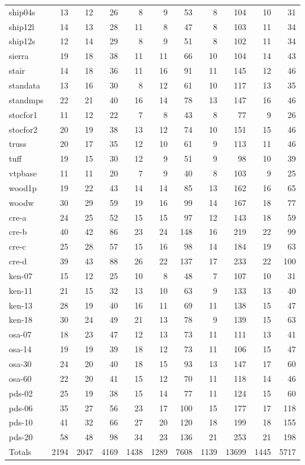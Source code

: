 \begin{small}
\begin{longtable}{|l|r|rr||r|rr||rr||rr|}
ship04s  & 13 & 12 & 26  & 8 & 9 & 53 & 8 & 104 & 10 & 31 \\
ship12l  & 14 & 13 & 28  & 11 & 8 & 47 & 8 & 103 & 11 & 34 \\
ship12s  & 12 & 14 & 29  & 8 & 9 & 51 & 8 & 102 & 11 & 34 \\
sierra   & 19 & 18 & 38  & 11 & 11 & 66 & 10 & 104 & 14 & 43 \\
stair    & 14 & 18 & 36  & 11 & 16 & 91 & 11 & 145 & 12 & 46 \\
standata & 13 & 16 & 30  & 8 & 12 & 61 & 10 & 117 & 13 & 35 \\
standmps & 22 & 21 & 40  & 16 & 14 & 78 & 13 & 147 & 16 & 46 \\
stocfor1 & 11 & 12 & 22  & 7 & 8 & 43 & 8 & 77 & 9 & 26 \\
stocfor2 & 20 & 19 & 38  & 13 & 12 & 74 & 10 & 151 & 15 & 46 \\
truss    & 20 & 17 & 35  & 12 & 10 & 61 & 9 & 113 & 11 & 46 \\
tuff     & 19 & 15 & 30  & 12 & 9 & 51 & 9 & 98 & 10 & 39 \\
vtpbase  & 11 & 11 & 20  & 7 & 9 & 40 & 8 & 103 & 9 & 25 \\
wood1p   & 19 & 22 & 43  & 14 & 14 & 85 & 13 & 162 & 16 & 65 \\
woodw    & 30 & 29 & 59  & 19 & 16 & 99 & 14 & 167 & 18 & 77 \\
cre-a    & 24 & 25 & 52  & 15 & 15 & 97 & 12 & 143 & 18 & 59 \\
cre-b    & 40 & 42 & 86  & 23 & 24 & 148 & 16 & 219 & 22 & 99 \\
cre-c    & 25 & 28 & 57  & 15 & 16 & 98 & 14 & 184 & 19 & 63 \\
cre-d    & 39 & 43 & 88  & 26 & 22 & 137 & 17 & 233 & 22 & 100 \\
ken-07   & 15 & 12 & 25  & 10 & 8 & 48 & 7 & 107 & 10 & 31 \\
ken-11   & 21 & 15 & 32  & 13 & 10 & 63 & 9 & 133 & 13 & 40 \\
ken-13   & 28 & 19 & 40  & 16 & 11 & 69 & 11 & 138 & 15 & 47 \\
ken-18   & 30 & 24 & 49  & 21 & 13 & 78 & 9 & 139 & 15 & 63 \\
osa-07   & 18 & 23 & 47  & 12 & 13 & 73 & 11 & 111 & 13 & 41 \\
osa-14   & 19 & 19 & 39  & 18 & 12 & 73 & 11 & 106 & 15 & 47 \\
osa-30   & 24 & 20 & 40  & 18 & 15 & 93 & 13 & 147 & 17 & 60 \\
osa-60   & 22 & 20 & 41  & 15 & 12 & 70 & 11 & 118 & 14 & 46 \\
pds-02   & 25 & 19 & 38  & 15 & 14 & 77 & 11 & 124 & 15 & 60 \\
pds-06   & 35 & 27 & 56  & 23 & 17 & 100 & 15 & 177 & 17 & 118 \\
pds-10   & 41 & 32 & 66 & 27 & 20 & 120 & 18 & 199 & 18 & 155 \\
pds-20   & 58 & 48 & 98 & 34 & 23 & 136 & 21 & 253 & 21 & 198 \\ \hline
Totals & 2194 & 2047 & 4169 & 1438 & 1289 & 7608 & 1139 & 13699 & 1445 & 5717
\end{longtable} 
\end{small}

